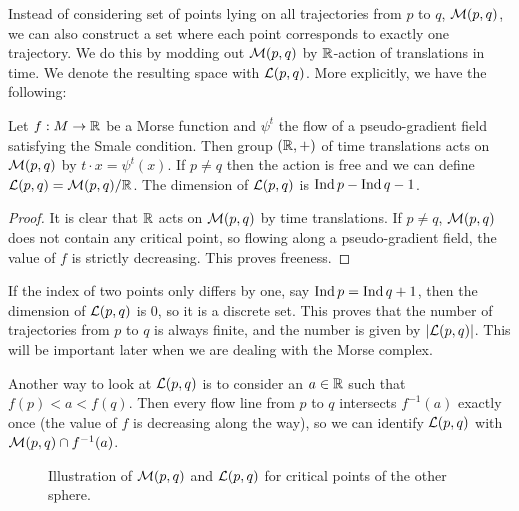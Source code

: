 Instead of considering set of points lying on all trajectories from $p$ to $q$, $\mathcal M(p, q)$, we can also construct a set where each point corresponds to exactly one trajectory.
We do this by modding out $\mathcal M(p, q)$ by $\mathbb{R}$-action of translations in time. We denote the resulting space with $\mathcal L(p, q)$.
More explicitly, we have the following:

\begin{prop}
    Let $f: M \to  \mathbb{R}$ be a Morse function and $\psi^{t}$ the flow of a pseudo-gradient field satisfying the Smale condition.
    Then group $(\mathbb{R}, +)$ of time translations acts on $\mathcal M(p, q)$ by  $t \cdot x = \psi^{t}(x)$.  If $p \neq q$ then the action is free and we can define $ \mathcal L(p, q) = \mathcal M(p, q) / \mathbb{R} $. The dimension of $\mathcal L(p, q)$ is $\operatorname{Ind} p - \operatorname{Ind} q - 1$.
\end{prop}
\begin{proof}
    It is clear that $\mathbb{R}$ acts on $\mathcal M(p, q)$ by time translations. 
    If $p \neq q$,  $\mathcal M(p, q)$ does not contain any critical point, so flowing along a pseudo-gradient field, the value of $f$ is strictly decreasing. This proves freeness.
\end{proof}

\begin{remark}
    If the index of two points only differs by one, say $\operatorname{Ind} p = \operatorname{Ind} q + 1$, then the dimension of $\mathcal L(p, q)$ is $0$, so it is a discrete set.
    This proves that the number of trajectories from $p$ to $q$ is always finite, and the number is given by $| \mathcal L(p, q)|$.
    This will be important later when we are dealing with the Morse complex.
\end{remark}
\begin{remark}
    Another way to look at $\mathcal L(p, q)$ is to consider an $a \in \mathbb{R}$ such that $f(p)<a<f(q)$. Then every flow line from $p$ to $q$  intersects $f^{-1}(a)$ exactly once (the value of $f$ is decreasing along the way), so we can identify  $\mathcal L(p, q)$ with  $\mathcal M(p, q) \cap f^{-1}(a)$.
\end{remark}




\begin{figure}[H]
    \centering
    \caption{
        Illustration of $\mathcal M(p, q)$ and $\mathcal L(p, q)$ for critical points of the other sphere.
    }
    \label{fig:mathcal-m-trajectories-other-sphere}
\end{figure}



